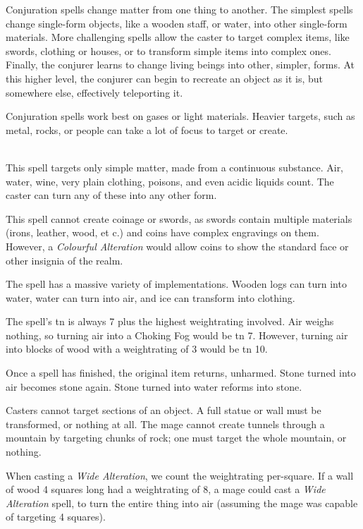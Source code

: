 \begin{multicols}{2}

\noindent
Conjuration spells change matter from one thing to another.
The simplest spells change single-form objects, like a wooden staff, or water, into other single-form materials.
More challenging spells allow the caster to target complex items, like swords, clothing or houses, or to transform simple items into complex ones.
Finally, the conjurer learns to change living beings into other, simpler, forms.
At this higher level, the conjurer can begin to recreate an object as it is, but somewhere else, effectively teleporting it.

Conjuration spells work best on gases or light materials.
Heavier targets, such as metal, rocks, or people can take a lot of focus to target or create.

\spelllevel

\\
This spell targets only simple matter, made from a continuous substance.
Air, water, wine, very plain clothing, poisons, and even acidic liquids count.
The caster can turn any of these into any other form.

This spell cannot create coinage or swords, as swords contain multiple materials (irons, leather, wood, et c.) and coins have complex engravings on them.
However, a \textit{Colourful Alteration} would allow coins to show the standard face or other insignia of the realm.

The spell has a massive variety of implementations.
Wooden logs can turn into water, water can turn into air, and ice can transform into clothing.

The spell's \gls{tn} is always 7 plus the highest \gls{weightrating} involved.
Air weighs nothing, so turning air into a Choking Fog would be \gls{tn} 7.
However, turning air into blocks of wood with a \gls{weightrating} of 3 would be \gls{tn} 10.

Once a spell has finished, the original item returns, unharmed.
Stone turned into air becomes stone again.
Stone turned into water reforms into stone.

Casters cannot target sections of an object.
A full statue or wall must be transformed, or nothing at all.
The mage cannot create tunnels through a mountain by targeting chunks of rock; one must target the whole mountain, or nothing.

When casting a \textit{Wide Alteration}, we count the \gls{weightrating} per-square.
If a wall of wood 4 squares long had a \gls{weightrating} of 8, a mage could cast a \textit{Wide Alteration} spell, to turn the entire thing into air (assuming the mage was capable of targeting 4 squares).


\end{multicols}
